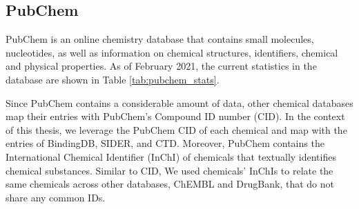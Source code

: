 \subsection{PubChem}
PubChem \cite{kim2021pubchem} is an online chemistry database that contains small molecules, nucleotides, as well as information on chemical structures, identifiers, chemical and physical properties. As of February 2021, the current statistics in the database are shown in Table \ref{tab:pubchem_stats}. 


\newpage
Since PubChem contains a considerable amount of data, other chemical databases map their entries with PubChem's Compound ID number (CID). In the context of this thesis, we leverage the PubChem CID of each chemical and map with the entries of BindingDB, SIDER, and CTD. Moreover, PubChem contains the International Chemical Identifier (InChI) of chemicals that textually identifies chemical substances. Similar to CID, We used chemicals' InChIs to relate the same chemicals across other databases, ChEMBL and DrugBank, that do not share any common IDs.